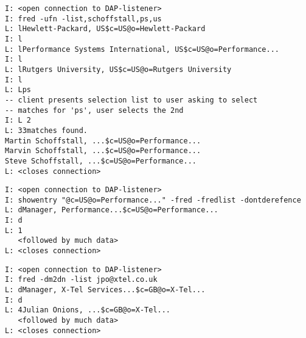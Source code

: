 \begin{bwslide}

\begin{verbatim}
I: <open connection to DAP-listener>
I: fred -ufn -list,schoffstall,ps,us
L: lHewlett-Packard, US$c=US@o=Hewlett-Packard
I: l
L: lPerformance Systems International, US$c=US@o=Performance...
I: l
L: lRutgers University, US$c=US@o=Rutgers University
I: l
L: Lps
-- client presents selection list to user asking to select
-- matches for 'ps', user selects the 2nd
I: L 2
L: 33matches found.
Martin Schoffstall, ...$c=US@o=Performance...
Marvin Schoffstall, ...$c=US@o=Performance...
Steve Schoffstall, ...$c=US@o=Performance...
L: <closes connection>
\end{verbatim}
\end{bwslide}


\begin{bwslide}

\begin{verbatim}
I: <open connection to DAP-listener>
I: showentry "@c=US@o=Performance..." -fred -fredlist -dontderefence
L: dManager, Performance...$c=US@o=Performance...
I: d
L: 1
   <followed by much data>
L: <closes connection>
\end{verbatim}
\end{bwslide}


\begin{bwslide}

\begin{verbatim}
I: <open connection to DAP-listener>
I: fred -dm2dn -list jpo@xtel.co.uk
L: dManager, X-Tel Services...$c=GB@o=X-Tel...
I: d
L: 4Julian Onions, ...$c=GB@o=X-Tel...
   <followed by much data>
L: <closes connection>
\end{verbatim}
\end{bwslide}

